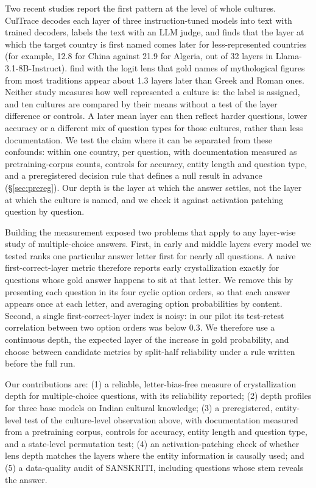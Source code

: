 Two recent studies report the first pattern at the level of whole cultures.
CulTrace \citep{yu2025cultrace} decodes each layer of three instruction-tuned models into text with trained decoders, labels the text with an LLM judge, and finds that the layer at which the target country is first named comes later for less-represented countries (for example, 12.8 for China against 21.9 for Algeria, out of 32 layers in Llama-3.1-8B-Instruct).
\citet{chelombitko2026cultural} find with the logit lens that gold names of mythological figures from most traditions appear about 1.3 layers later than Greek and Roman ones.
Neither study measures how well represented a culture is: the label is assigned, and ten cultures are compared by their means without a test of the layer difference or controls.
A later mean layer can then reflect harder questions, lower accuracy or a different mix of question types for those cultures, rather than less documentation.
We test the claim where it can be separated from these confounds: within one country, per question, with documentation measured as pretraining-corpus counts, controls for accuracy, entity length and question type, and a preregistered decision rule that defines a null result in advance (\S\ref{sec:prereg}).
Our depth is the layer at which the answer settles, not the layer at which the culture is named, and we check it against activation patching question by question.

Building the measurement exposed two problems that apply to any layer-wise study of multiple-choice answers.
First, in early and middle layers every model we tested ranks one particular answer letter first for nearly all questions.
A naive first-correct-layer metric therefore reports early crystallization exactly for questions whose gold answer happens to sit at that letter.
We remove this by presenting each question in its four cyclic option orders, so that each answer appears once at each letter, and averaging option probabilities by content.
Second, a single first-correct-layer index is noisy: in our pilot its test-retest correlation between two option orders was below 0.3.
We therefore use a continuous depth, the expected layer of the increase in gold probability, and choose between candidate metrics by split-half reliability under a rule written before the full run.

Our contributions are:
(1) a reliable, letter-bias-free measure of crystallization depth for multiple-choice questions, with its reliability reported;
(2) depth profiles for three base models on Indian cultural knowledge;
(3) a preregistered, entity-level test of the culture-level observation above, with documentation measured from a pretraining corpus, controls for accuracy, entity length and question type, and a state-level permutation test;
(4) an activation-patching check of whether lens depth matches the layers where the entity information is causally used; and
(5) a data-quality audit of SANSKRITI, including \nLeaks{} questions whose stem reveals the answer.

